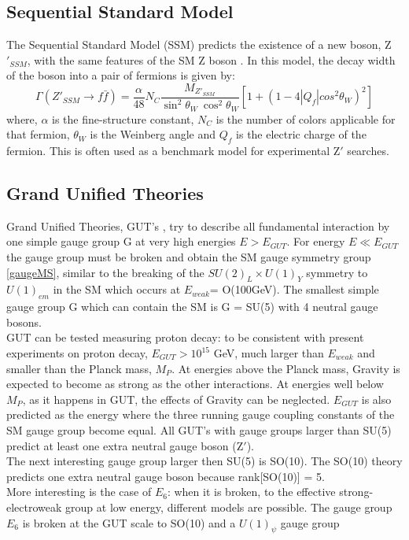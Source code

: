 \subsection{Sequential Standard Model}
The Sequential Standard Model (SSM) predicts the existence of a new boson, Z$'_{SSM}$, with the same features of the SM Z boson \cite{Z_SSM}. In this model, the decay width of the boson into a pair of fermions is given by:
\[
\Gamma(Z'_{SSM}\to f\bar{f}) = \frac{\alpha}{48}N_C\frac{M_{Z'_{SSM}}}{\sin^2\theta_W\ \cos^2\theta_W}[1+(1-4|Q_f|cos^2\theta_W)^2]
\]
where, $\alpha$ is the fine-structure constant, $N_C$ is the number of colors applicable for that fermion, $\theta_W$ is the Weinberg angle and $Q_f$ is the electric charge of the fermion.
This is often used as a benchmark model for experimental Z$'$ searches.

\subsection{Grand Unified Theories}
Grand Unified Theories, GUT's \cite{GUT}, try to describe all fundamental interaction by one simple gauge group G at very high energies $E> E_{GUT}$. For energy $E\ll E_{GUT}$ the gauge group must be broken and obtain the SM gauge symmetry group \ref{gaugeMS}, similar to the breaking of the $SU(2)_L\times U(1)_Y$ symmetry to $U(1)_{em}$ in the SM which occurs at $E_{weak} $= O(100GeV). The smallest simple gauge group G which can contain the SM is G = SU(5) with 4 neutral gauge bosons.  \\
GUT can be tested measuring proton decay: to be consistent with present experiments on proton decay,  $E_{GUT}>10^{15}$ GeV, much larger than $E_{weak}$ and smaller than the Planck mass, $M_P$. At energies above the Planck mass, Gravity is expected to become as strong as the other interactions. At energies well below $M_P$, as it happens in GUT, the effects of Gravity can be neglected. $E_{GUT}$ is also predicted as the energy where the three running gauge coupling constants of the SM gauge group become equal.
All GUT's with gauge groups larger than SU(5) predict at least one extra neutral gauge boson (Z$'$). \\
The next interesting gauge group larger then SU(5) is SO(10). The SO(10) theory predicts one extra neutral gauge boson because rank[SO(10)] = 5. \\
More interesting is the case of $E_6$: when it is broken, to the effective strong-electroweak group at low energy, different models are possible. The gauge group $E_6$ is broken at the GUT scale to SO(10) and a $U(1)_\psi$ gauge group

